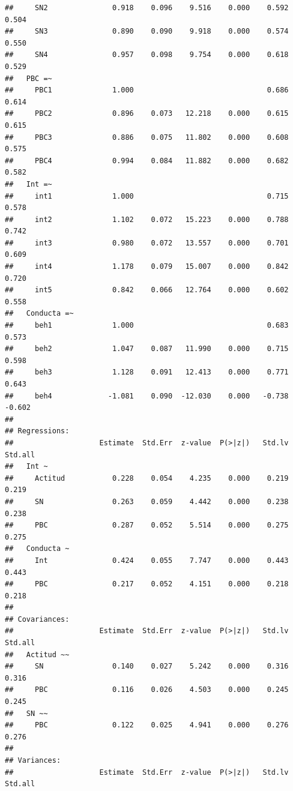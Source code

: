 \documentclass[
]{article}
\begin{document}
\begin{verbatim}
##     SN2               0.918    0.096    9.516    0.000    0.592    0.504
##     SN3               0.890    0.090    9.918    0.000    0.574    0.550
##     SN4               0.957    0.098    9.754    0.000    0.618    0.529
##   PBC =~                                                                
##     PBC1              1.000                               0.686    0.614
##     PBC2              0.896    0.073   12.218    0.000    0.615    0.615
##     PBC3              0.886    0.075   11.802    0.000    0.608    0.575
##     PBC4              0.994    0.084   11.882    0.000    0.682    0.582
##   Int =~                                                                
##     int1              1.000                               0.715    0.578
##     int2              1.102    0.072   15.223    0.000    0.788    0.742
##     int3              0.980    0.072   13.557    0.000    0.701    0.609
##     int4              1.178    0.079   15.007    0.000    0.842    0.720
##     int5              0.842    0.066   12.764    0.000    0.602    0.558
##   Conducta =~                                                           
##     beh1              1.000                               0.683    0.573
##     beh2              1.047    0.087   11.990    0.000    0.715    0.598
##     beh3              1.128    0.091   12.413    0.000    0.771    0.643
##     beh4             -1.081    0.090  -12.030    0.000   -0.738   -0.602
## 
## Regressions:
##                    Estimate  Std.Err  z-value  P(>|z|)   Std.lv  Std.all
##   Int ~                                                                 
##     Actitud           0.228    0.054    4.235    0.000    0.219    0.219
##     SN                0.263    0.059    4.442    0.000    0.238    0.238
##     PBC               0.287    0.052    5.514    0.000    0.275    0.275
##   Conducta ~                                                            
##     Int               0.424    0.055    7.747    0.000    0.443    0.443
##     PBC               0.217    0.052    4.151    0.000    0.218    0.218
## 
## Covariances:
##                    Estimate  Std.Err  z-value  P(>|z|)   Std.lv  Std.all
##   Actitud ~~                                                            
##     SN                0.140    0.027    5.242    0.000    0.316    0.316
##     PBC               0.116    0.026    4.503    0.000    0.245    0.245
##   SN ~~                                                                 
##     PBC               0.122    0.025    4.941    0.000    0.276    0.276
## 
## Variances:
##                    Estimate  Std.Err  z-value  P(>|z|)   Std.lv  Std.all

\end{verbatim}
\end{document}
